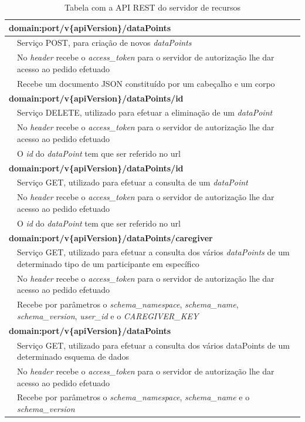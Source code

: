 \begin{table}[H]
\label{t:apirest-data}
\centering
\begin{tabularx}{1\textwidth}{|p{0.3cm} p{14.4cm}|}
\multicolumn{2}{l}{\textbf{domain:port/v\{apiVersion\}/dataPoints}}  \\ \hline 
 & Serviço POST, para criação de novos  \textit{dataPoints} \\
 & No  \textit{header} recebe o  \textit{access\_token} para o servidor de autorização lhe dar acesso ao pedido efetuado \\
 & Recebe um documento JSON constituído por um cabeçalho e um corpo \\ \hline
\multicolumn{2}{l}{\textbf{domain:port/v\{apiVersion\}/dataPoints/id}} \\ \hline
 & Serviço DELETE, utilizado para efetuar a eliminação de um  \textit{dataPoint} \\
 & No  \textit{header} recebe o  \textit{access\_token} para o servidor de autorização lhe dar acesso ao pedido efetuado \\
 & O  \textit{id} do  \textit{dataPoint} tem que ser referido no url \\ \hline
 \multicolumn{2}{l}{\textbf{domain:port/v\{apiVersion\}/dataPoints/id}} \\ \hline
 & Serviço GET, utilizado para efetuar a consulta de um  \textit{dataPoint} \\
 & No  \textit{header} recebe o  \textit{access\_token} para o servidor de autorização lhe dar acesso ao pedido efetuado \\
 & O  \textit{id} do  \textit{dataPoint} tem que ser referido no url \\ \hline
 \multicolumn{2}{l}{\textbf{domain:port/v\{apiVersion\}/dataPoints/caregiver}} \\ \hline
 & Serviço GET, utilizado para efetuar a consulta dos vários  \textit{dataPoints} de um determinado tipo de um participante em específico \\
 & No  \textit{header} recebe o  \textit{access\_token} para o servidor de autorização lhe dar acesso ao pedido efetuado \\
 & Recebe por parâmetros o  \textit{schema\_namespace},  \textit{schema\_name},  \textit{schema\_version},  \textit{user\_id} e o  \textit{CAREGIVER\_KEY} \\ \hline
 \multicolumn{2}{l}{\textbf{domain:port/v\{apiVersion\}/dataPoints}} \\ \hline
 & Serviço GET, utilizado para efetuar a consulta dos vários dataPoints de um determinado esquema de dados \\
 & No  \textit{header} recebe o  \textit{access\_token} para o servidor de autorização lhe dar acesso ao pedido efetuado \\
 & Recebe por parâmetros o  \textit{schema\_namespace},  \textit{schema\_name} e o  \textit{schema\_version} \\ \hline
\end{tabularx}
\caption{Tabela com a API REST do servidor de recursos}
\end{table}


